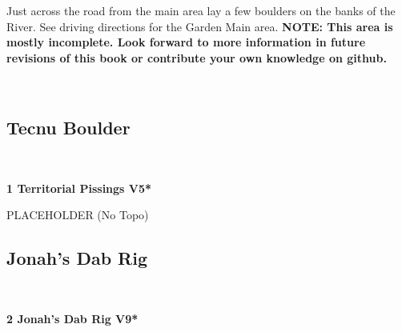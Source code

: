 \raggedcolumns
\begin{multicols}{2}
\begin{minipage}{\columnwidth}
Just across the road from the main area lay a few boulders on the banks of the River. See driving directions for the Garden Main area.
\newline
\textbf{NOTE: This area is mostly incomplete. Look forward to more information in future revisions of this book or contribute your own knowledge on github.}
\end{minipage}

\newpage
	\begin{minipage}{\columnwidth}
	\
	\end{minipage}
	
			\begin{minipage}{\columnwidth}
			\subsection*{Tecnu Boulder}\label{bf:Tecnu Boulder}
			\
			
			\end{minipage}
			
					\begin{minipage}{\linewidth}	
					\label{rt:Territorial Pissings}
\colorbox{RoyalBlue!20}{
\parbox{0.95\textwidth}{
\textbf{
1 Territorial Pissings V5*  
}
}
}

					\begin{adjustwidth}{0.5cm}{}				
					PLACEHOLDER
						\newline (No Topo) 
					\end{adjustwidth}
					\end{minipage}
			\begin{minipage}{\columnwidth}
			\subsection*{Jonah's Dab Rig}\label{bf:Jonah's Dab Rig}
			\
			
			\end{minipage}
			
					\begin{minipage}{\linewidth}	
					\label{rt:Jonah's Dab Rig}
\colorbox{Goldenrod!50}{
\parbox{0.95\textwidth}{
\textbf{
2 Jonah's Dab Rig V9*  
}
}
}


\end{minipage}
\end{multicols}
